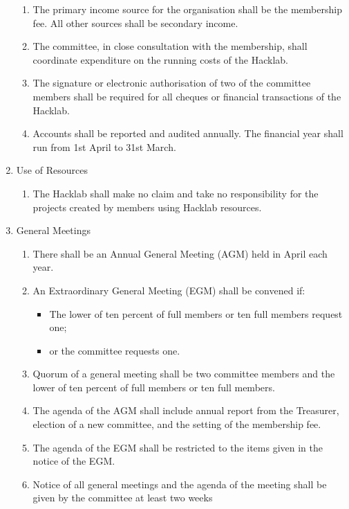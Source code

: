\documentclass{article}
\begin{document}
\begin{enumerate}
\begin{enumerate}
    \item The primary income source for the organisation shall be
      the membership fee. All other sources shall be secondary income.
    \item The committee, in close consultation with the membership, shall
      coordinate expenditure on the running costs of the Hacklab.
    \item The signature or electronic authorisation of two of the
      committee members shall be required for all cheques or
      financial transactions of the Hacklab.
    \item Accounts shall be reported and audited annually. The
      financial year shall run from 1st April to 31st March.
    \end{enumerate}
    \item Use of Resources
      \begin{enumerate}
      \item \cbstart The Hacklab shall make no claim and take no responsibility
        for the projects created by members using Hacklab resources. \cbend
        \cbdelete
      \end{enumerate}
    \item General Meetings
      \begin{enumerate}
      \item There shall be an Annual General Meeting (AGM) held in
        April each year.
      \item An Extraordinary General Meeting (EGM) shall be convened if:
        \begin{itemize}
        \item The lower of ten percent of full members or ten full
          members request one;
        \item or the committee requests one.
        \end{itemize}
      \item Quorum of a general meeting shall be two committee members
        and the lower of ten percent of full members or ten full
        members.
      \item The agenda of the AGM shall include annual report from the
        Treasurer, election of a new committee, and the setting of the
        membership fee.
      \item The agenda of the EGM shall be restricted to the items
        given in the notice of the EGM.
      \item Notice of all general meetings and the agenda of the
        meeting shall be given by the committee at least two weeks

\end{enumerate}
\end{enumerate}
\end{document}

